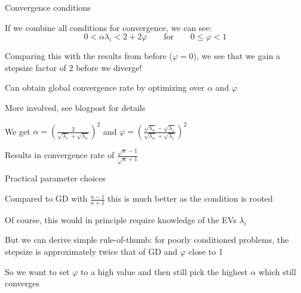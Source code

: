 \documentclass[11pt,compress,t,notes=noshow, xcolor=table]{beamer}
\begin{document}
\begin{framei}{Convergence conditions}
\item If we combine all conditions for convergence, we can see:
$$
0 < \alpha \lambda_i < 2 + 2 \varphi\qquad \text{for}\qquad 0 \leq \varphi < 1
$$
\item Comparing this with the results from before ($\varphi = 0$), we see that we gain a stepsize factor of 2 before we diverge!
\item Can obtain global convergence rate by optimizing over $\alpha$ and $\varphi$
\item More involved, see blogpost for details
\item We get $\alpha = \left(\frac{2}{\sqrt{\lambda_1} + \sqrt{\lambda_n}}\right)^2$
and $\varphi = \left(\frac{\sqrt{\lambda_n} - \sqrt{\lambda_1}}{\sqrt{\lambda_n} + \sqrt{\lambda_1}} \right)^2$
\item Results in convergence rate of $\frac{\sqrt{\kappa} - 1}{\sqrt{\kappa} + 1}$
\end{framei}


\begin{framei}{Practical parameter choices}
\item Compared to GD with $\frac{\kappa - 1}{\kappa + 1}$ this is much better as the condition is rooted
\item Of course, this would in principle require knowledge of the EVs $\lambda_i$
\item But we can derive simple rule-of-thumb: for poorly conditioned problems, the stepsize is approximately twice that of GD and $\varphi$ close to 1
\item So we want to set $\varphi$ to a high value and then still pick the highest $\alpha$ which still converges
\end{framei}

\endlecture
\end{document}
